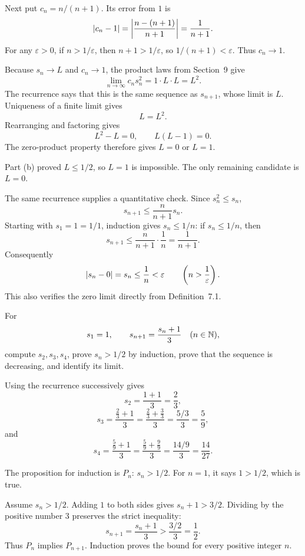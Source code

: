 Next put $c_n=n/(n+1)$. Its error from $1$ is
\[
 \left|c_n-1\right|
 =\left|\frac{n-(n+1)}{n+1}\right|
 =\frac1{n+1}.
\]
For any $\varepsilon>0$, if $n>1/\varepsilon$, then
$n+1>1/\varepsilon$, so $1/(n+1)<\varepsilon$.
Thus $c_n\to1$.

Because $s_n\to L$ and $c_n\to1$, the product laws from Section~9 give
\[
 \lim_{n\to\infty}c_ns_n^2=1\cdot L\cdot L=L^2.
\]
The recurrence says that this is the same sequence as $s_{n+1}$,
whose limit is $L$. Uniqueness of a finite limit gives
\[
 L=L^2.
\]
Rearranging and factoring gives
\[
 L^2-L=0,\qquad L(L-1)=0.
\]
The zero-product property therefore gives $L=0$ or $L=1$.

Part (b) proved $L\le1/2$, so $L=1$ is impossible.
The only remaining candidate is $L=0$.


The same recurrence supplies a quantitative check. Since $s_n^2\le s_n$,
\[
 s_{n+1}\le\frac n{n+1}s_n.
\]
Starting with $s_1=1=1/1$, induction gives $s_n\le1/n$:
if $s_n\le1/n$, then
\[
 s_{n+1}\le\frac n{n+1}\cdot\frac1n=\frac1{n+1}.
\]
Consequently
\[
 \left|s_n-0\right|=s_n\le\frac1n<\varepsilon
 \qquad\left(n>\frac1\varepsilon\right).
\]
This also verifies the zero limit directly from Definition~7.1.


\goal For
\[
 s_1=1,\qquad s_{n+1}=\frac{s_n+1}{3}\quad(n\in\mathbb{N}),
\]
compute $s_2,s_3,s_4$, prove $s_n>1/2$ by induction, prove that the
sequence is decreasing, and identify its limit.

Using the recurrence successively gives
\[
 s_2=\frac{1+1}{3}=\frac23,
\]
\[
 s_3=\frac{\frac23+1}{3}
     =\frac{\frac23+\frac33}{3}
     =\frac{5/3}{3}=\frac59,
\]
and
\[
 s_4=\frac{\frac59+1}{3}
     =\frac{\frac59+\frac99}{3}
     =\frac{14/9}{3}=\frac{14}{27}.
\]


The proposition for induction is $P_n$: $s_n>1/2$.
For $n=1$, it says $1>1/2$, which is true.

Assume $s_n>1/2$.
Adding $1$ to both sides gives $s_n+1>3/2$.
Dividing by the positive number $3$ preserves the strict inequality:
\[
 s_{n+1}=\frac{s_n+1}{3}>\frac{3/2}{3}=\frac12.
\]
Thus $P_n$ implies $P_{n+1}$. Induction proves the bound for every
positive integer $n$.

